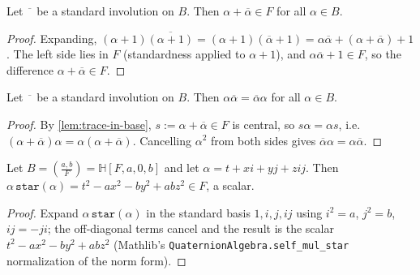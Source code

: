 \begin{lemma}
    \label{lem:trace-in-base}
    Let $\overline{\phantom{a}}$ be a standard involution on $B$. Then
    $\alpha + \overline{\alpha} \in F$ for all $\alpha \in B$.
\end{lemma}
\begin{proof}
    Expanding, $(\alpha+1)\overline{(\alpha+1)} = (\alpha+1)(\overline{\alpha}+1)
    = \alpha\overline{\alpha} + (\alpha + \overline{\alpha}) + 1$. The left side
    lies in $F$ (standardness applied to $\alpha + 1$), and $\alpha\overline\alpha
    + 1 \in F$, so the difference $\alpha + \overline{\alpha} \in F$.
\end{proof}

\begin{lemma}
    \label{lem:norm-comm}
    Let $\overline{\phantom{a}}$ be a standard involution on $B$. Then
    $\alpha\overline{\alpha} = \overline{\alpha}\alpha$ for all $\alpha \in B$.
\end{lemma}
\begin{proof}
    By \ref{lem:trace-in-base}, $s := \alpha + \overline{\alpha} \in F$ is central,
    so $s\alpha = \alpha s$, i.e. $(\alpha + \overline{\alpha})\alpha =
    \alpha(\alpha + \overline{\alpha})$. Cancelling $\alpha^2$ from both sides
    gives $\overline{\alpha}\alpha = \alpha\overline{\alpha}$.
\end{proof}

\begin{lemma}
    \label{lem:quaternion-norm-form}
    Let $B = \left(\frac{a,b}{F}\right) = \mathbb{H}[F,a,0,b]$ and let
    $\alpha = t + xi + yj + zij$. Then $\alpha\,\texttt{star}(\alpha) =
    t^2 - ax^2 - by^2 + abz^2 \in F$, a scalar.
\end{lemma}
\begin{proof}
    Expand $\alpha\,\texttt{star}(\alpha)$ in the standard basis $1, i, j, ij$
    using $i^2 = a$, $j^2 = b$, $ij = -ji$; the off-diagonal terms cancel and the
    result is the scalar $t^2 - ax^2 - by^2 + abz^2$ (Mathlib's
    \texttt{QuaternionAlgebra.self\_mul\_star} normalization of the norm form).
\end{proof}

